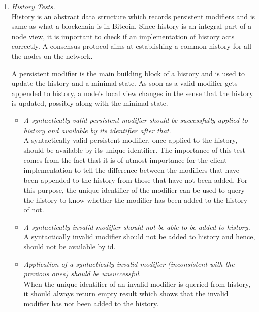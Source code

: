 \begin{enumerate}[\IEEEsetlabelwidth{Z}]
\begin{itemize}[]
\end{itemize}

\item \textit{History Tests.}\\

History is an abstract data structure which records persistent modifiers and is same as what a blockchain is in Bitcoin. Since history is an integral part of a node view, it is important to check if an implementation of history acts correctly. A consensus protocol aims at establishing a common history for all the nodes on the network.

A persistent modifier is the main building block of a history and is used to update the history and a minimal state. As soon as a valid modifier gets appended to history, a node's local view changes in the sense that the history is updated, possibly along with the minimal state.

\begin{itemize}[]
\item \textit{A syntactically valid persistent modifier should be successfully applied to history and available by its identifier after that}.\\
A syntactically valid persistent modifier, once applied to the history, should be available by its unique identifier. The importance of this test comes from the fact that it is of utmost importance for the client implementation to tell the difference between the modifiers that have been appended to the history from those that have not been added. For this purpose, the unique identifier of the modifier can be used to query the history to know whether the modifier has been added to the history of not.

\item \textit{A syntactically invalid modifier should not be able to be added to history.}\\
A syntactically invalid modifier should not be added to history and hence, should not be available by id.

\item \textit{Application of a syntactically invalid modifier (inconsistent with the previous ones) should be unsuccessful}.\\
When the unique identifier of an invalid modifier is queried from history, it should always return empty result which shows that the invalid modifier has not been added to the history.


\end{itemize}
\end{enumerate}
